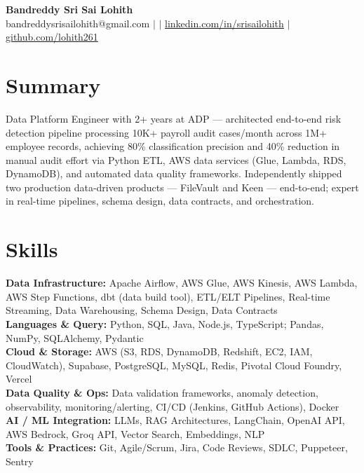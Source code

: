 \documentclass[10pt,letterpaper]{article}
\newcommand{\skillrow}[2]{\textbf{#1:} #2 \\[1pt]}
\begin{document}
\begin{center}
  {\Huge\bfseries Bandreddy Sri Sai Lohith}\\[3pt]
  \small bandreddysrisailohith@gmail.com $\vert$ $\vert$\; \href{https://linkedin.com/in/srisailohith}{linkedin.com/in/srisailohith} $\vert$\; \href{https://github.com/lohith261}{github.com/lohith261}
\end{center}

\section{Summary}

Data Platform Engineer with 2+ years at ADP --- architected end-to-end risk detection pipeline processing 10K+ payroll audit cases/month across 1M+ employee records, achieving 80\% classification precision and 40\% reduction in manual audit effort via Python ETL, AWS data services (Glue, Lambda, RDS, DynamoDB), and automated data quality frameworks.
      Independently shipped two production data-driven products --- FileVault and Keen --- end-to-end; expert in real-time pipelines, schema design, data contracts, and orchestration.

\section{Skills}

\skillrow{Data Infrastructure}{Apache Airflow, AWS Glue, AWS Kinesis, AWS Lambda, AWS Step Functions, dbt (data build tool), ETL/ELT Pipelines, Real-time Streaming, Data Warehousing, Schema Design, Data Contracts}
\skillrow{Languages \& Query}{Python, SQL, Java, Node.js, TypeScript; Pandas, NumPy, SQLAlchemy, Pydantic}
\skillrow{Cloud \& Storage}{AWS (S3, RDS, DynamoDB, Redshift, EC2, IAM, CloudWatch), Supabase, PostgreSQL, MySQL, Redis, Pivotal Cloud Foundry, Vercel}
\skillrow{Data Quality \& Ops}{Data validation frameworks, anomaly detection, observability, monitoring/alerting, CI/CD (Jenkins, GitHub Actions), Docker}
\skillrow{AI / ML Integration}{LLMs, RAG Architectures, LangChain, OpenAI API, AWS Bedrock, Groq API, Vector Search, Embeddings, NLP}
\skillrow{Tools \& Practices}{Git, Agile/Scrum, Jira, Code Reviews, SDLC, Puppeteer, Sentry}
\end{document}
